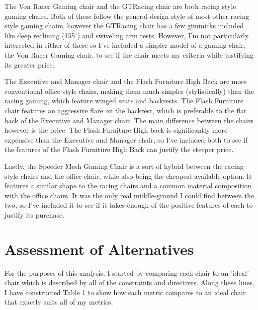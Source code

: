 \documentclass[11pt]{article}
\begin{document}
    
    The Von Racer Gaming chair and the GTRacing chair are both racing style gaming chairs. Both of these follow the general design style of most other racing style gaming chairs, however the GTRacing chair has a few gimmicks included like deep reclining (155$^\circ$) and swiveling arm rests. However, I'm not particularly interested in either of these so I've included a simpler model of a gaming chair, the Von Racer Gaming chair, to see if the chair meets my criteria while justifying its greater price. 
    
    The Executive and Manager chair and the Flash Furniture High Back are more conventional office style chairs, making them much simpler (stylistically) than the racing gaming, which feature winged seats and backrests. The Flash Furniture chair features an aggressive flare on the backrest, which is preferable to the flat back of the Executive and Manager chair. The main difference between the chairs however is the price. The Flash Furniture High back is significantly more expensive than the Executive and Manager chair, so I've included both to see if the features of the Flash Furniture High Back can justify the steeper price. 
    
    Lastly, the Speeder Mesh Gaming Chair is a sort of hybrid between the racing style chairs and the office chair, while also being the cheapest available option. It features a similar shape to the racing chairs and a common material composition with the office chairs. It was the only real middle-ground I could find between the two, so I've included it to see if it takes enough of the positive features of each to justify its purchase.

    \section{Assessment of Alternatives}
    For the purposes of this analysis, I started by comparing each chair to an 'ideal' chair which is described by all of the constraints and directives. Along these lines, I have constructed Table 1 to show how each metric compares to an ideal chair that exactly suits all of my metrics. 
\end{document}
